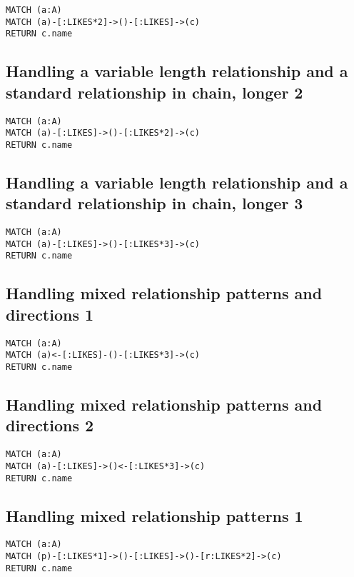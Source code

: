 \begin{lstlisting}
MATCH (a:A)
MATCH (a)-[:LIKES*2]->()-[:LIKES]->(c)
RETURN c.name
\end{lstlisting}

\subsection{Handling a variable length relationship and a standard relationship in chain, longer 2}

\begin{lstlisting}
MATCH (a:A)
MATCH (a)-[:LIKES]->()-[:LIKES*2]->(c)
RETURN c.name
\end{lstlisting}

\subsection{Handling a variable length relationship and a standard relationship in chain, longer 3}

\begin{lstlisting}
MATCH (a:A)
MATCH (a)-[:LIKES]->()-[:LIKES*3]->(c)
RETURN c.name
\end{lstlisting}

\subsection{Handling mixed relationship patterns and directions 1}

\begin{lstlisting}
MATCH (a:A)
MATCH (a)<-[:LIKES]-()-[:LIKES*3]->(c)
RETURN c.name
\end{lstlisting}

\subsection{Handling mixed relationship patterns and directions 2}

\begin{lstlisting}
MATCH (a:A)
MATCH (a)-[:LIKES]->()<-[:LIKES*3]->(c)
RETURN c.name
\end{lstlisting}

\subsection{Handling mixed relationship patterns 1}

\begin{lstlisting}
MATCH (a:A)
MATCH (p)-[:LIKES*1]->()-[:LIKES]->()-[r:LIKES*2]->(c)
RETURN c.name
\end{lstlisting}


